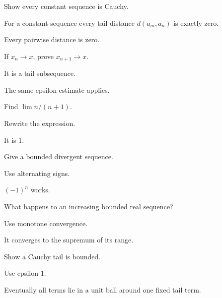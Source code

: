 \begin{exercise}\label{exr:ii03-03}
Show every constant sequence is Cauchy.
\end{exercise}
\begin{hint}
For a constant sequence every tail distance \(d(a_m,a_n)\) is exactly zero.
\end{hint}
\begin{solution}
Every pairwise distance is zero.
\end{solution}

\begin{exercise}\label{exr:ii03-04}
If $x_n\to x$, prove $x_{n+1}\to x$.
\end{exercise}
\begin{hint}
It is a tail subsequence.
\end{hint}
\begin{solution}
The same epsilon estimate applies.
\end{solution}

\begin{exercise}\label{exr:ii03-05}
Find $\lim n/(n+1)$.
\end{exercise}
\begin{hint}
Rewrite the expression.
\end{hint}
\begin{solution}
It is $1$.
\end{solution}

\begin{exercise}\label{exr:ii03-06}
Give a bounded divergent sequence.
\end{exercise}
\begin{hint}
Use alternating signs.
\end{hint}
\begin{solution}
$(-1)^n$ works.
\end{solution}

\begin{exercise}\label{exr:ii03-07}
What happens to an increasing bounded real sequence?
\end{exercise}
\begin{hint}
Use monotone convergence.
\end{hint}
\begin{solution}
It converges to the supremum of its range.
\end{solution}

\begin{exercise}\label{exr:ii03-08}
Show a Cauchy tail is bounded.
\end{exercise}
\begin{hint}
Use epsilon $1$.
\end{hint}
\begin{solution}
Eventually all terms lie in a unit ball around one fixed tail term.
\end{solution}


